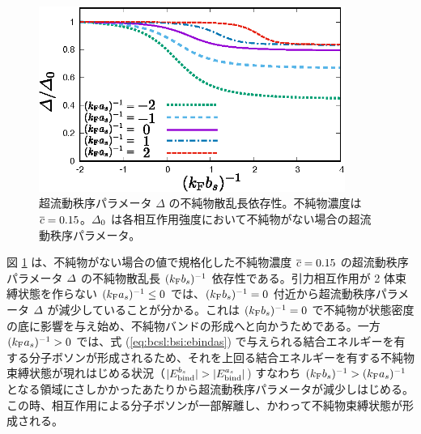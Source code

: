 \begin{figure}[t]
\centering
\includegraphics[width=100mm]{eps/bcsl-ias-ibs.eps}
\caption{超流動秩序パラメータ $\varDelta$ の不純物散乱長依存性。不純物濃度は $\overline{c}=0.15$。$\varDelta_0$ は各相互作用強度において不純物がない場合の超流動秩序パラメータ。}
\label{fig:bcsl:imp:ibs-vs-ias}
\end{figure}

図 \ref{fig:bcsl:imp:ibs-vs-ias} は、不純物がない場合の値で規格化した不純物濃度 $\overline{c}=0.15$ の超流動秩序パラメータ $\varDelta$ の不純物散乱長 $(k_{\text{F}} b_s)^{-1}$ 依存性である。引力相互作用が 2 体束縛状態を作らない $(k_{\text{F}} a_s)^{-1}\le 0$ では、$(k_{\text{F}} b_s)^{-1}=0$ 付近から超流動秩序パラメータ $\varDelta$ が減少していることが分かる。これは $(k_{\text{F}} b_s)^{-1}=0$ で不純物が状態密度の底に影響を与え始め、不純物バンドの形成へと向かうためである。一方 $(k_{\text{F}} a_s)^{-1} > 0$ では、式 (\ref{eq:bcsl:bsi:ebindas}) で与えられる結合エネルギーを有する分子ボソンが形成されるため、それを上回る結合エネルギーを有する不純物束縛状態が現れはじめる状況（$|E_{\text{bind}}^{b_s}| > |E_{\text{bind}}^{a_s}|$) すなわち $(k_{\text{F}} b_s)^{-1}>(k_{\text{F}} a_s)^{-1}$ となる領域にさしかかったあたりから超流動秩序パラメータが減少しはじめる。この時、相互作用による分子ボソンが一部解離し、かわって不純物束縛状態が形成される。


